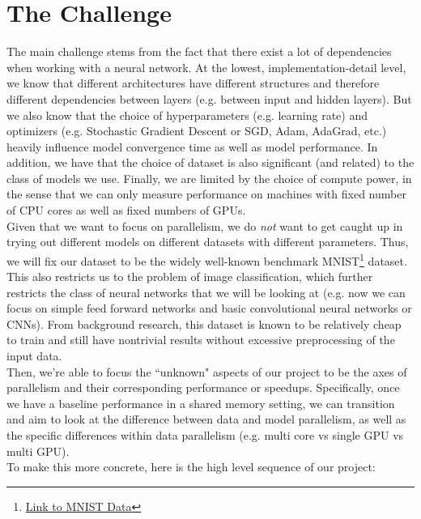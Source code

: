 \documentclass{article}
\begin{document}
\section*{The Challenge}

The main challenge stems from the fact that there exist a lot of dependencies when working with a neural network. At the lowest, implementation-detail level, we know that different architectures have different structures and therefore different dependencies between layers (e.g. between input and hidden layers). But we also know that the choice of hyperparameters (e.g. learning rate) and optimizers (e.g. Stochastic Gradient Descent or SGD, Adam, AdaGrad, etc.) heavily influence model convergence time as well as model performance. In addition, we have that the choice of dataset is also significant (and related) to the class of models we use. Finally, we are limited by the choice of compute power, in the sense that we can only measure performance on machines with fixed number of CPU cores as well as fixed numbers of GPUs.\\

Given that we want to focus on parallelism, we do \textit{not} want to get caught up in trying out different models on different datasets with different parameters. Thus, we will fix our dataset to be the widely well-known benchmark MNIST\footnote{\href{http://yann.lecun.com/exdb/mnist/}{Link to MNIST Data}} dataset. This also restricts us to the problem of image classification, which further restricts the class of neural networks that we will be looking at (e.g. now we can focus on simple feed forward networks and basic convolutional neural networks or CNNs). From background research, this dataset is known to be relatively cheap to train and still have nontrivial results without excessive preprocessing of the input data.\\

Then, we're able to focus the ``unknown" aspects of our project to be the axes of parallelism and their corresponding performance or speedups. Specifically, once we have a baseline performance in a shared memory setting, we can transition and aim to look at the difference between data and model parallelism, as well as the specific differences within data parallelism (e.g. multi core vs single GPU vs multi GPU). \\

To make this more concrete, here is the high level sequence of our project:
\end{document}
